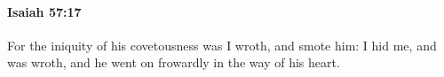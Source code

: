 
		\paragraph{Isaiah 57:17} %
			\label{ISAIAH-57-17}

			For the iniquity of his covetousness was I wroth, and smote him: I hid me, and was wroth, and he went on frowardly in the way of his heart.


